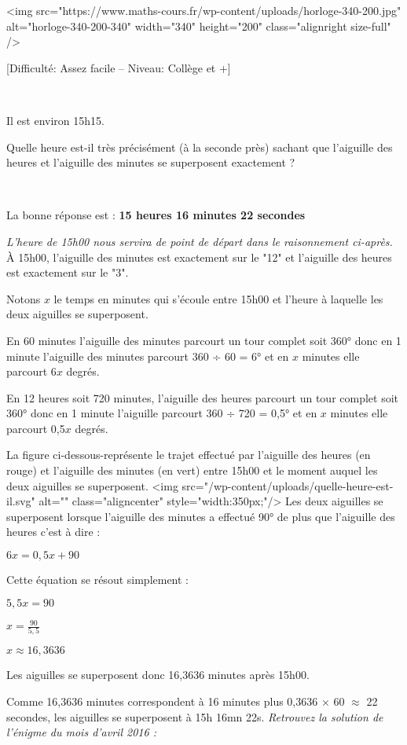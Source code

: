 
%
<img src="https://www.maths-cours.fr/wp-content/uploads/horloge-340-200.jpg" alt="horloge-340-200-340" width="340" height="200" class="alignright size-full" />

\begin{center}
\end{center}
[Difficulté: Assez facile – Niveau: Collège et +]
\par
~
\par
Il est environ 15h15.
\par
Quelle heure est-il très précisément (à la seconde près) sachant que l'aiguille des heures et l'aiguille des minutes se superposent exactement ?
\par
~
\begin{note}La bonne réponse est : \textbf{15 heures 16 minutes 22 secondes}\end{note}
\textit{L'heure de 15h00 nous servira de point de départ dans le raisonnement ci-après.}
À 15h00, l'aiguille des minutes est exactement sur le "12" et l'aiguille des heures est exactement sur le "3".
\par
Notons $x$ le temps en minutes qui s'écoule entre 15h00 et l'heure à laquelle les deux aiguilles se superposent.
\par
En  60 minutes l'aiguille des minutes parcourt un tour complet soit 360° donc en 1 minute l'aiguille des minutes parcourt  360 ÷ 60 = 6° et en $x$ minutes elle parcourt 6$x$ degrés.
\par
En 12 heures soit 720 minutes, l'aiguille des heures parcourt un tour complet soit 360° donc en 1 minute l'aiguille parcourt 360  ÷ 720 = 0,5° et en $x$ minutes elle parcourt 0,5$x$ degrés.
\par
La figure ci-dessous-représente le trajet effectué par l'aiguille des heures (en rouge) et l'aiguille des minutes (en vert) entre 15h00 et le moment auquel les deux aiguilles se superposent.
<img src="/wp-content/uploads/quelle-heure-est-il.svg" alt="" class="aligncenter" style="width:350px;"/>
Les deux aiguilles se superposent lorsque l'aiguille des minutes a effectué 90° de plus que l'aiguille des heures c'est à dire :
\par
$6x=0,5x+90$
\par
Cette équation se résout simplement :
\par
$5,5x=90$
\par
$x=\frac{90}{5,5}$
\par
$x \approx 16,3636$
\par
Les aiguilles se superposent donc 16,3636 minutes après 15h00.
\par
Comme 16,3636 minutes correspondent à 16 minutes plus 0,3636 $\times$ 60 $\approx$ 22 secondes, les aiguilles se superposent à 15h 16mn 22s.
\textit{Retrouvez la solution de l'énigme du mois d'avril 2016 : }
